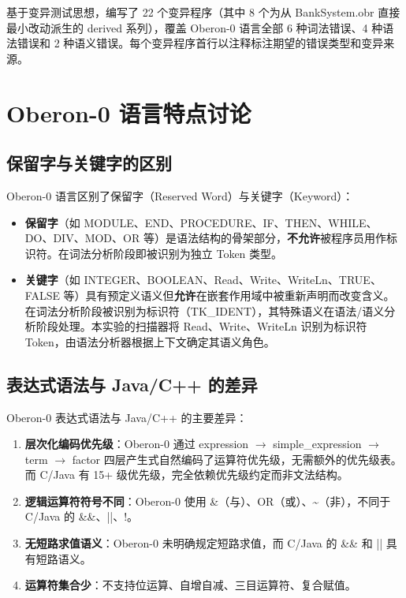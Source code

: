 基于变异测试思想，编写了 22 个变异程序（其中 8 个为从 BankSystem.obr 直接最小改动派生的 derived 系列），覆盖 Oberon-0 语言全部 6 种词法错误、4 种语法错误和 2 种语义错误。每个变异程序首行以注释标注期望的错误类型和变异来源。

\section{Oberon-0 语言特点讨论}

\subsection{保留字与关键字的区别}

Oberon-0 语言区别了保留字（Reserved Word）与关键字（Keyword）：

\begin{itemize}
    \item \textbf{保留字}（如 MODULE、END、PROCEDURE、IF、THEN、WHILE、DO、DIV、MOD、OR 等）是语法结构的骨架部分，\textbf{不允许}被程序员用作标识符。在词法分析阶段即被识别为独立 Token 类型。
    \item \textbf{关键字}（如 INTEGER、BOOLEAN、Read、Write、WriteLn、TRUE、FALSE 等）具有预定义语义但\textbf{允许}在嵌套作用域中被重新声明而改变含义。在词法分析阶段被识别为标识符（TK\_IDENT），其特殊语义在语法/语义分析阶段处理。本实验的扫描器将 Read、Write、WriteLn 识别为标识符 Token，由语法分析器根据上下文确定其语义角色。
\end{itemize}

\subsection{表达式语法与 Java/C++ 的差异}

Oberon-0 表达式语法与 Java/C++ 的主要差异：

\begin{enumerate}
    \item \textbf{层次化编码优先级}：Oberon-0 通过 expression $\to$ simple\_expression $\to$ term $\to$ factor 四层产生式自然编码了运算符优先级，无需额外的优先级表。而 C/Java 有 15+ 级优先级，完全依赖优先级约定而非文法结构。
    \item \textbf{逻辑运算符符号不同}：Oberon-0 使用 \&（与）、OR（或）、\~{}（非），不同于 C/Java 的 \&\&、||、!。
    \item \textbf{无短路求值语义}：Oberon-0 未明确规定短路求值，而 C/Java 的 \&\& 和 || 具有短路语义。
    \item \textbf{运算符集合少}：不支持位运算、自增自减、三目运算符、复合赋值。
\end{enumerate}

